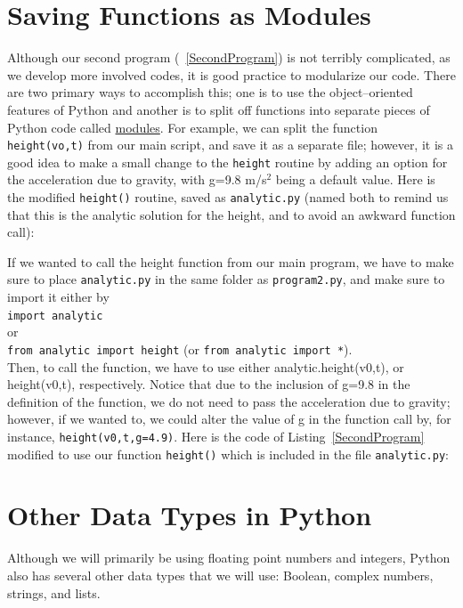 \section{Saving Functions as Modules}
\label{sec:Modules}
Although our second program (~\ref{SecondProgram}) is not terribly complicated, as we develop more involved codes, it is good practice to modularize our code. There are two primary ways to accomplish this; one is to use the object--oriented features of Python and another is to split off functions into separate pieces of Python code called \href{http://docs.python.org/tut/node8.html}{modules}. For example, we can split the function \verb!height(vo,t)! from our main script, and save it as a separate file; however, it is a good idea to make a small change to the \verb!height! routine by adding an option for the acceleration due to gravity, with g=9.8 m/s$^2$ being a default value. Here is the modified \verb!height()! routine, saved as \verb!analytic.py! (named both to remind us that this is the analytic solution for the height, and to avoid an awkward function call):
%

% 
If we wanted to call the height function from our main program, we have to make sure to place \verb!analytic.py! in the same folder as \verb!program2.py!, and make sure to import it either by \\
\verb!import analytic!\\
or \\
\verb!from analytic import height! (or \verb!from analytic import *!).\\
Then, to call the function, we have to use either analytic.height(v0,t), or height(v0,t), respectively. Notice that due to the inclusion of g=9.8 in the definition of the function, we do not need to pass the acceleration due to gravity; however, if we wanted to, we could alter the value of g in the function call by, for instance, \verb!height(v0,t,g=4.9)!. 
Here is the code of Listing~\ref{SecondProgram} modified to use our function \verb!height()! which is included in the file \verb!analytic.py!:
%

%


\section{Other Data Types in Python}
\label{sec-datatypes}
Although we will primarily be using floating point numbers and integers, Python also has several other data types that we will use: Boolean, complex numbers, strings, and lists. 
